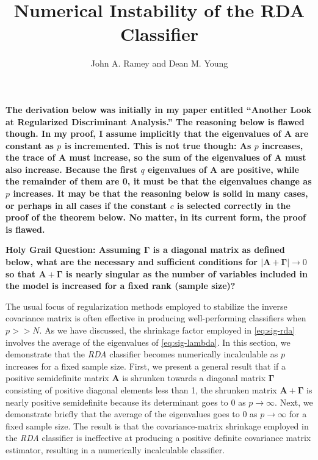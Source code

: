 \documentclass[11pt]{article}
\title{Numerical Instability of the RDA Classifier}
\author{John A. Ramey and Dean M. Young}
\begin{document}
\newtheorem*{thm}{Theorem}
\newtheorem*{cor}{Corollary}


\doublespacing

\maketitle

\textbf{The derivation below was initially in my paper entitled ``Another Look at Regularized Discriminant Analysis.'' The reasoning below is flawed though. In my proof, I assume implicitly that the eigenvalues of $\bm A$ are constant as $p$ is incremented. This is not true though: As $p$ increases, the trace of $\bm A$ must increase, so the sum of the eigenvalues of $\bm A$ must also increase. Because the first $q$ eigenvalues of $\bm A$ are positive, while the remainder of them are 0, it must be that the eigenvalues change as $p$ increases. It may be that the reasoning below is solid in many cases, or perhaps in all cases if the constant $c$ is selected correctly in the proof of the theorem below. No matter, in its current form, the proof is flawed.}

\textbf{Holy Grail Question: Assuming $\bm \Gamma$ is a diagonal matrix as defined below, what are the necessary and sufficient conditions for $|\bm A + \bm \Gamma| \rightarrow 0$ so that $\bm A + \bm \Gamma$ is nearly singular as the number of variables included in the model is increased for a fixed rank (sample size)?}

The usual focus of regularization methods employed to stabilize the inverse covariance matrix is often effective in producing well-performing classifiers when $p >> N$. As we have discussed, the shrinkage factor employed in \eqref{eq:sig-rda} involves the average of the eigenvalues of \eqref{eq:sig-lambda}. In this section, we demonstrate that the \emph{RDA} classifier becomes numerically incalculable as $p$ increases for a fixed sample size. First, we present a general result  that if a positive semidefinite matrix $\bm A$ is shrunken towards a diagonal matrix $\bm \Gamma$ consisting of positive diagonal elements less than 1, the shrunken matrix $\bm A + \bm \Gamma$ is nearly positive semidefinite because its determinant goes to 0 as $p \rightarrow \infty$. Next, we demonstrate briefly that the average of the eigenvalues goes to 0 as $p \rightarrow \infty$ for a fixed sample size. The result is that the covariance-matrix shrinkage employed in the \emph{RDA} classifier is ineffective at producing a positive definite covariance matrix estimator, resulting in a numerically incalculable classifier.
\end{document}
